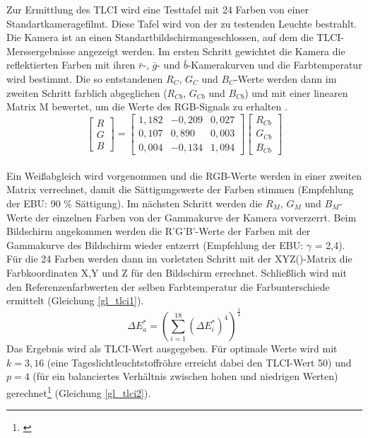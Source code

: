 Zur Ermittlung des TLCI wird eine Testtafel mit 24 Farben von einer \glqq Standartkamera\grqq gefilmt. Diese Tafel wird von der zu testenden Leuchte bestrahlt. Die Kamera ist an einen \glqq Standartbildschirm\grqq angeschlossen, auf dem die TLCI-Merssergebnisse angezeigt werden.
Im ersten Schritt gewichtet die Kamera die reflektierten Farben mit ihren $\bar{r}$-, $\bar{g}$- und $\bar{b}$-Kamerakurven und die Farbtemperatur wird bestimmt. Die so entstandenen $R_{C}$, $G_{C}$ und $B_{C}$-Werte werden dann im zweiten Schritt farblich abgeglichen ($R_{Cb}$, $G_{Cb}$ und $B_{Cb}$) und mit einer linearen Matrix M bewertet, um die Werte des RGB-Signals zu erhalten .
\begin{equation}\label{gl_tlci1}
\begin{bmatrix} R \\ G \\ B \end{bmatrix}= 
\begin{bmatrix} 1,182 & -0,209 & 0,027 \\ 0,107 & 0,890 & 0,003 \\ 0,004 & -0,134 & 1,094 \end{bmatrix}
\begin{bmatrix} R_{Cb} \\ G_{Cb} \\ B_{Cb} \end{bmatrix}
\end{equation}\\
Ein Weißabgleich wird vorgenommen und die RGB-Werte werden in einer zweiten Matrix verrechnet, damit die Sättigungswerte der Farben stimmen (Empfehlung der EBU: 90 \% Sättigung). Im nächsten Schritt werden die $R_{M}$, $G_{M}$ und $B_{M}$-Werte der einzelnen Farben von der Gammakurve der Kamera vorverzerrt.
Beim Bildschirm angekommen werden die R'G'B'-Werte der Farben mit der Gammakurve des Bildschirm wieder entzerrt (Empfehlung der EBU: $\gamma$ = 2,4). Für die 24 Farben werden dann im vorletzten Schritt mit der XYZ()-Matrix  die Farbkoordinaten X,Y und Z für den Bildschirm errechnet. Schließlich wird mit den Referenzenfarbwerten der selben Farbtemperatur die Farbunterschiede ermittelt (Gleichung \ref{gl_tlci1}).
\begin{equation}\label{gl_tlci1}
		\Delta E_{a} ^{*} = \left( {\sum_{i=1}^{18}(\Delta E_{i} ^{*})^{4}}  \right)^{\frac{1}{4}} 
\end{equation}
Das Ergebnis wird als TLCI-Wert ausgegeben. Für optimale Werte wird mit $k = 3,16$ (eine Tageslichtleuchtstoffröhre erreicht dabei den TLCI-Wert 50) und $p = 4$ (für ein balanciertes Verhältnis zwischen hohen und niedrigen Werten) gerechnet\footnote{\cite[16-22]{roberts}} (Gleichung \ref{gl_tlci2}).


